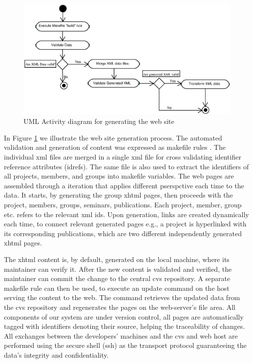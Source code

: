 \documentclass[10pt]{article}
\begin{document}
\begin{figure}[h!]
\includegraphics[scale=0.6]{generate-web-site}
\caption{UML Activity diagram for generating the web site}
\label{fig:generate-web-site}
\end{figure}

In Figure \ref{fig:generate-web-site} we illustrate the web site generation process.
The automated validation and generation of content was
expressed as makefile rules \cite{OTT91}.
The individual {\sc xml} files are merged in a
single {\sc xml} file for cross validating identifier
reference attributes ({\sc idref}s).
The same file is also used to extract the identifiers of
all projects, members, and groups into makefile
variables.
The web pages are assembled through a iteration that applies different pserspctive each time
to the data. It starts, by generating the group {\sc xhtml} pages, then proceeds with the project, members, groups, seminars, publications.
Each project, member, group etc. refers to the relevant {\sc xml id}s.
Upon generation, links are created dynamically each time, to
connect relevant generated pages e.g., a project is hyperlinked with its corresponding publications,
which are two different independently generated {\sc xhtml} pages.

The {\sc xhtml} content is, by default, generated on the
local machine, where its maintainer can verify it.
After the new content is validated and verified,
the maintainer can commit the change to the central {\sc cvs} repository. 
A separate makefile rule can then be used,
to execute an update command on the
host serving the content to the web.
The command retrieves the updated data from the {\sc cvs}
repository and regenerates the pages on the web-server's
file area.
All components of our system are under version control,
all pages are automatically tagged with identifiers
denoting their source, helping the traceability of changes.
All exchanges between the developers' machines and the
{\sc cvs} and web host are performed using the secure
shell ({\sc ssh}) as the transport protocol guaranteeing the data's integrity
and confidentiality.
\end{document}
